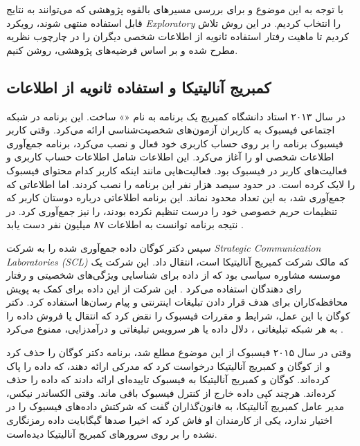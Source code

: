 با توجه به این موضوع و برای بررسی مسیر‌های بالقوه پژوهشی که می‌توانند به نتایج قابل استفاده منتهی شوند، رویکرد \textit{
  \gls{Exploratory}
} را انتخاب کردیم. 
در این روش تلاش کردیم تا ماهیت رفتار استفاده ثانویه از اطلاعات شخصی دیگران را در چارچوب نظریه‌ مطرح شده و بر
اساس فرضیه‌های پژوهشی، روشن کنیم. 

\subsection*{کمبریج آنالیتیکا و استفاده ثانویه از اطلاعات}
در سال ۲۰۱۳ استاد دانشگاه کمبریج یک برنامه به نام
«»
ساخت. این برنامه در شبکه اجتماعی فیسبوک به کاربران
آزمون‌های شخصیت‌شناسی ارائه می‌کرد. وقتی کاربر فیسبوک برنامه را بر روی حساب کاربری خود فعال و نصب
می‌کرد، برنامه جمع‌آوری اطلاعات شخصی او را آغاز می‌کرد. این اطلاعات شامل اطلاعات حساب کاربری و فعالیت‌های کاربر در فیسبوک
بود. فعالیت‌هایی مانند اینکه کاربر کدام محتوای فیسبوک را لایک کرده است. در حدود سیصد هزار نفر این
برنامه را نصب کردند. اما اطلاعاتی که جمع‌آوری شد، به این تعداد محدود نماند.
این برنامه اطلاعاتی درباره دوستان کاربر که تنظیمات حریم خصوصی خود را درست  تنظیم نکرده بودند، را
نیز جمع‌آوری کرد. در نتیجه برنامه توانست به اطلاعات ۸۷ میلیون نفر دست یابد
\!\citep{kangFacebookSaysCambridge}.

سپس دکتر کوگان داده جمع‌آوری شده را به شرکت
\textit{
  \gls{ Strategic Communication Laboratories (SCL)}
}
که مالک شرکت کمبریج آنالیتیکا است، انتقال داد. این شرکت یک موسسه مشاوره
سیاسی بود که از داده برای شناسایی ویژگی‌های شخصیتی و رفتار رای دهندگان
استفاده می‌کرد
\!\citep{rosenbergHowTrumpConsultants2018}.
این شرکت از این داده برای کمک به پویش محافظه‌کاران برای هدف
قرار دادن تبلیغات اینترنتی و پیام رسان‌ها استفاده کرد. دکتر کوگان با این عمل، شرایط و مقررات فیسبوک را نقض کرد که انتقال یا
فروش داده را به هر شبکه تبلیغاتی ، دلال داده یا هر سرویس تبلیغاتی
و درآمد‌زایی، ممنوع می‌کرد
\!\citep{granvilleFacebookCambridgeAnalytica2018}.

وقتی در سال ۲۰۱۵ فیسبوک از این موضوع مطلع شد، برنامه دکتر کوگان
را حذف  کرد و از کوگان و کمبریج آنالیتیکا درخواست کرد که
مدرکی ارائه دهند، که داده را پاک کرده‌اند. کوگان و کمبریج آنالیتیکا
به فیسبوک تاییده‌ای ارائه دادند که داده را حذف کرده‌اند. هرچند  کپی داده
خارج از کنترل فیسبوک باقی ماند.  وقتی الکساندر نیکس، مدیر عامل
کمبریج آنالیتیکا، به قانون‌گذاران گفت که شرکتش داده‌های فیسبوک را در
اختیار ندارد، یکی از کارمندان او فاش کرد که اخیرا صدها گیگابایت داده رمزنگاری نشده را
بر روی سرورهای کمبریج آنالیتیکا دیده‌است.


